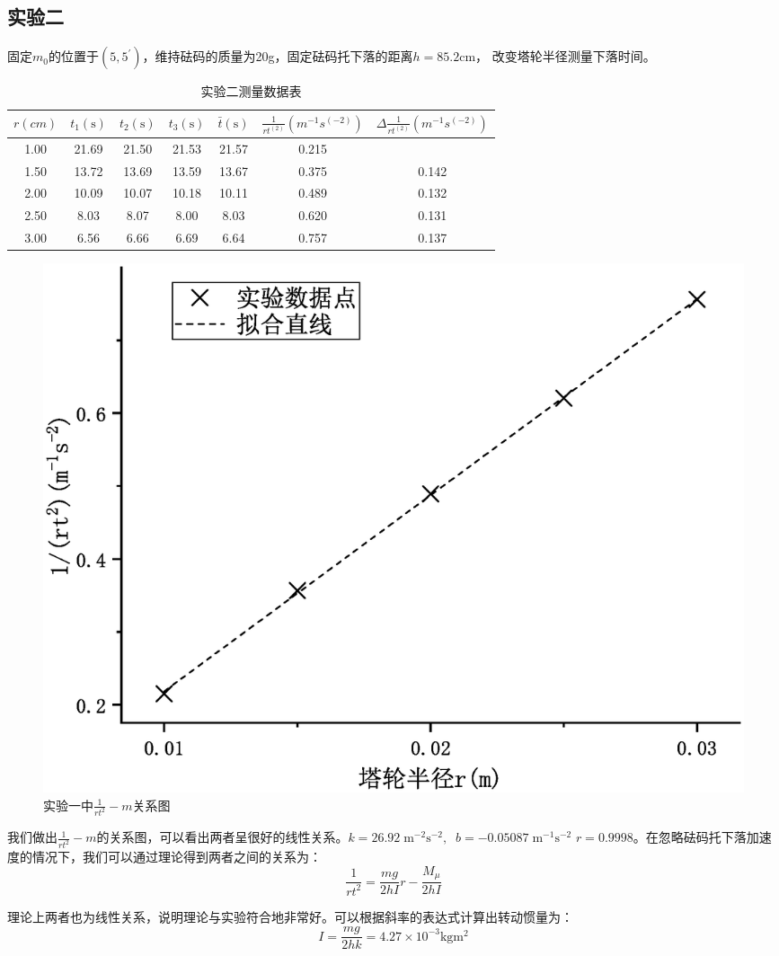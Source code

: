 \documentclass[a4paper]{ctexart}
\def\cm{\mathrm{cm}}
\def\s{\mathrm{s}}
\begin{document}
    \subsection{实验二}
    \par 
    固定$m_{0}$的位置于$(5,5^{'})$，维持砝码的质量为20g，固定砝码托下落的距离$h=85.2\cm$，
    改变塔轮半径测量下落时间。
    \begin{table}[htbp]
        \centering
        \caption{实验二测量数据表}
        \begin{tabular}{ccccccc}
            \toprule[1.5pt]
            $r(cm)$ & $t_{1}(\s)$ & $t_{2}(\s)$ & $t_{3}(\s)$ & $\bar{t}(\s)$ & $\frac{1}{rt^(2)}(m^{-1}s^(-2))$ & $\Delta \frac{1}{rt^(2)}(m^{-1}s^(-2))$ \\
            \midrule
            1.00 & 21.69 & 21.50 & 21.53 & 21.57 & 0.215 & \\
            1.50 & 13.72 & 13.69 & 13.59 & 13.67 & 0.375 & 0.142 \\
            2.00 & 10.09 & 10.07 & 10.18 & 10.11 & 0.489 & 0.132 \\
            2.50 & 8.03 & 8.07 & 8.00 & 8.03 & 0.620 & 0.131 \\
            3.00 & 6.56 & 6.66 & 6.69 & 6.64 & 0.757 & 0.137 \\
            \bottomrule[1.5pt]
        \end{tabular}
    \end{table}
    \begin{figure}[htbp]
        \centering
        \includegraphics[scale=0.48]{2_curve.eps}
        \caption{实验一中$\frac{1}{rt^{2}}-m$关系图}
    \end{figure}
    \par 
    我们做出$\frac{1}{rt^{2}}-m$的关系图，可以看出两者呈很好的线性关系。$k = 26.92\;\mathrm{m^{-2}s^{-2}},\;\; b = -0.05087\;\mathrm{m^{-1}s^{-2}}$
    $r = 0.9998$。在忽略砝码托下落加速度的情况下，我们可以通过理论得到两者之间的关系为：
    $$
    \frac{1}{rt^{2}} = \frac{mg}{2hI}r - \frac{M_{\mu}}{2hI}
    $$
    \par 
    理论上两者也为线性关系，说明理论与实验符合地非常好。可以根据斜率的表达式计算出转动惯量为：
    $$
    I = \frac{mg}{2hk} = 4.27 \times 10^{-3} \mathrm{kg m^{2}}
    $$
\end{document}
